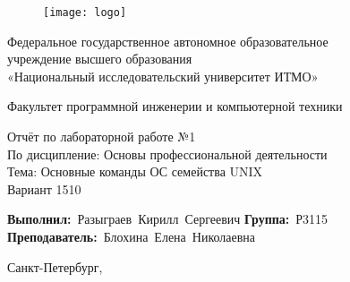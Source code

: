 \newcommand{\Faculty}{Факультет программной инженерии и компьютерной техники}

\newcommand{\TeacherPosition}{}
\newcommand{\TeacherName}{Блохина Елена Николаевна}

\newcommand{\LabSubject}{Основы профессиональной деятельности}
\newcommand{\LabNumber}{№1}
\newcommand{\LabName}{Основные команды ОС семейства UNIX}
\newcommand{\Variant}{1510}
 
\newcommand{\StudentGroup}{Р3115}
\newcommand{\StudentName}{Разыграев Кирилл Сергеевич}


\thispagestyle{empty}
\setlength{\parindent}{0cm} %

\begin{figure}[h]
	\centering
	\texttt{[image: logo]}
\end{figure}
\vspace{-\baselineskip}


\begin{center}
	Федеральное государственное автономное образовательное \\
	учреждение высшего образования\\
	«Национальный исследовательский университет ИТМО»
\end{center}\par

\begin{center}
	\vspace{12pt}
	\Faculty
\end{center}\par

\vspace{\fill}
\begin{center}
	Отчёт по лабораторной работе \LabNumber \\
	По дисципление: \LabSubject \\
	Тема: \LabName \\
	Вариант \Variant
\end{center}\par

\vspace{\fill}
\vbox{
	\hfill
	\vbox{
		\hbox{\textbf{Выполнил:} \StudentName}
		\hbox{\textbf{Группа:} \StudentGroup \\}
		\hbox{\textbf{Преподаватель:} \TeacherPosition \TeacherName}
	}
} 


\vspace{\fill}
\begin{center}
	Санкт-Петербург, \the\year{}
\end{center}\par

\newpage

\setlength{\parindent}{1.25cm} %

